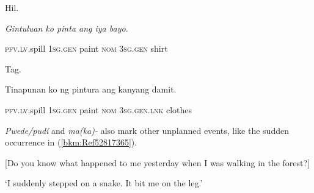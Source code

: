\begin{listWWNumiileveli}
\item 
\begin{listWWNumiilevelii}
\item 
\begin{stylelsLanginfo}
Hil.
\end{stylelsLanginfo}
\end{listWWNumiilevelii}
\end{listWWNumiileveli}
\begin{stylelsIMT}
\textit{Gintuluan ko pinta ang iya bayo.}
\end{stylelsIMT}

\begin{stylelsIMT}
\textsc{pfv}.\textsc{lv}.spill \textsc{1sg.gen }paint\textsc{ nom }3\textsc{sg.gen} shirt
\end{stylelsIMT}

\begin{listWWNumiileveli}
\item 
\begin{listWWNumiilevelii}
\item 
\begin{stylelsLanginfo}
Tag.
\end{stylelsLanginfo}
\end{listWWNumiilevelii}
\end{listWWNumiileveli}
\begin{stylelsSourceline}
Tinapunan ko ng pintura ang kanyang damit.
\end{stylelsSourceline}

\begin{stylelsIMT}
\textsc{pfv}.\textsc{lv}.spill \textsc{1sg.gen }paint\textsc{ nom }3\textsc{sg.gen.lnk} clothes
\end{stylelsIMT}

\begin{styleStandard}
\textit{Pwede/pud\'{i}} and \textit{ma(ka)-} also mark other unplanned events, like the sudden occurrence in (\ref{bkm:Ref52817365}). 
\end{styleStandard}

\begin{listWWNumiileveli}
\item 
\begin{stylelsLanginfo}
\label{bkm:Ref52817365}[Do you know what happened to me yesterday when I was walking in the forest?]
\end{stylelsLanginfo}
\end{listWWNumiileveli}
\begin{stylelsLanginfo}
‘I suddenly stepped on a snake. It bit me on the leg.’
\end{stylelsLanginfo}

